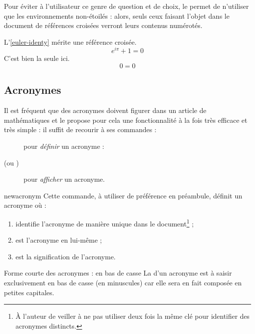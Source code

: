 Pour éviter à l'utilisateur ce genre de question et de choix, le
 permet de n'utiliser que les environnements non-étoilés :
alors, seuls ceux faisant l'objet dans le document de références croisées
verront leurs contenus numérotés.

\begin{bodycode}[listing and text,listing options={deletekeywords={label}}]
L'\vref{euler-identy} mérite une référence croisée.
\begin{equation}\label{euler-identy}
  e^{i\pi}+1=0
\end{equation}
C'est bien la seule ici.
\begin{equation}\label{not-interesting}
  0=0
\end{equation}
\end{bodycode}

\subsection{Acronymes}
\label{sec:acronymes}

Il est fréquent que des acronymes doivent figurer dans un article de
mathématiques et le  propose pour cela une fonctionnalité
à la fois très efficace et très simple : il suffit de recourir à ses commandes :
\begin{description}
\item[] pour \emph{définir} un acronyme :
\item[ (ou )] pour \emph{afficher} un acronyme.
\end{description}

\begin{docCommand}{newacronym}{}
  Cette commande, à utiliser de préférence en préambule, définit un acronyme
  où :
  \begin{enumerate}
  \item {} identifie l'acronyme de manière unique dans le
    document\footnote{À l'auteur de veiller à ne pas utiliser deux fois la même
      clé pour identifier des acronymes distincts.} ;
  \item {} est l'acronyme en lui-même ;
  \item {} est la signification de l'acronyme.
  \end{enumerate}
\begin{dbwarning}{Forme courte des acronymes : en bas de casse}{}
  La  d'un acronyme est à saisir exclusivement en bas de
  casse (en minuscules) car elle sera en fait composée en petites capitales.
\end{dbwarning}
\end{docCommand}

